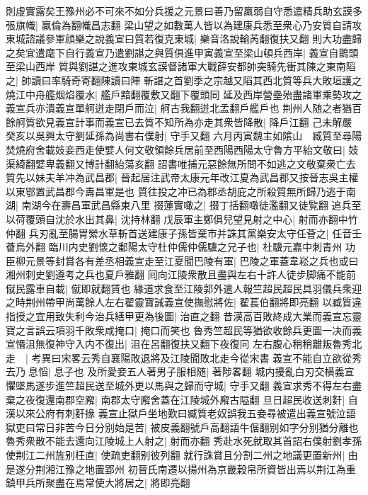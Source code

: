 則虛實露矣王豫州必不可來不如分兵援之元景曰善乃留羸弱自守悉遣精兵助玄謨多張旗幟|{
	羸倫為翻幟昌志翻}
梁山望之如數萬人皆以為建康兵悉至衆心乃安質自請攻東城諮議參軍顔樂之說義宣曰質若復克東城|{
	樂音洛說輸芮翻復扶又翻}
則大功盡歸之矣宜遣麾下自行義宣乃遣劉諶之與質俱進甲寅義宣至梁山頓兵西岸|{
	義宣自鵲頭至梁山西岸}
質與劉諶之進攻東城玄謨督諸軍大戰薛安都帥突騎先衝其陳之東南䧟之|{
	帥讀曰率騎奇寄翻陳讀曰陣}
斬諶之首劉季之宗越又䧟其西北質等兵大敗垣護之燒江中舟艦烟焰覆水|{
	艦戶黯翻覆敷又翻下覆頭同}
延及西岸營壘殆盡諸軍乘勢攻之義宣兵亦潰義宣單舸迸走閉戶而泣|{
	舸古我翻迸北孟翻戶艦戶也}
荆州人随之者猶百餘舸質欲見義宣計事而義宣已去質不知所為亦走其衆皆降散|{
	降戶江翻}
己未解嚴　癸亥以吳興太守劉延孫為尚書右僕射|{
	守手又翻}
六月丙寅魏主如隂山　臧質至尋陽焚燒府舍載妓妾西走使嬖人何文敬領餘兵居前至西陽西陽太守魯方平紿文敬曰|{
	妓渠綺翻嬖卑義翻又博計翻紿蕩亥翻}
詔書唯捕元惡餘無所問不如逃之文敬棄衆亡去質先以妹夫羊冲為武昌郡|{
	晉起居注武帝太康元年改江夏為武昌郡又按晉志吳主權以東鄂置武昌郡今夀昌軍是也}
質往投之冲已為郡丞胡庇之所殺質無所歸乃逃于南湖|{
	南湖今在壽昌軍武昌縣東八里}
掇蓮實噉之|{
	掇丁括翻噉徒濫翻又徒覧翻}
追兵至以荷覆頭自沈於水出其鼻|{
	沈持林翻}
戊辰軍主鄭俱兒望見射之中心|{
	射而亦翻中竹仲翻}
兵刃亂至腸胃縈水草斬首送建康子孫皆棄市并誅其黨樂安太守任薈之|{
	任音壬薈烏外翻}
臨川内史劉懷之鄱陽太守杜仲儒仲儒驥之兄子也|{
	杜驥元嘉中刺青州}
功臣柳元景等封賞各有差丞相義宣走至江夏聞巴陵有軍|{
	巴陵之軍蓋韋崧之兵也或曰湘州刺史劉遵考之兵也夏戶雅翻}
囘向江陵衆散且盡與左右十許人徒步脚痛不能前僦民露車自載|{
	僦即就翻賃也}
緣道求食至江陵郭外遣人報竺超民超民具羽儀兵衆迎之時荆州帶甲尚萬餘人左右翟靈寶誡義宣使撫慰將佐|{
	翟萇伯翻將即亮翻}
以臧質違指授之宜用致失利今治兵繕甲更為後圖|{
	治直之翻}
昔漢高百敗終成大業而義宣忘靈寶之言誤云項羽千敗衆咸掩口|{
	掩口而笑也}
魯秀竺超民等猶欲收餘兵更圖一决而義宣惽沮無復神守入内不復出|{
	沮在呂翻復扶又翻下夜復冋}
左右腹心稍稍離叛魯秀北走　|{
	考異曰宋畧云秀自襄陽敗退將及江陵聞敗北走今從宋書}
義宣不能自立欲從秀去乃息慆|{
	息子也}
及所愛妾五人著男子服相随|{
	著陟畧翻}
城内擾亂白刃交横義宣懼墜馬遂步進竺超民送至城外更以馬與之歸而守城|{
	守手又翻}
義宣求秀不得左右盡棄之夜復還南郡空廨|{
	南郡太守廨舍蓋在江陵城外廨古隘翻}
旦日超民收送刺姧|{
	自漢以來公府有刺姧掾}
義宣止獄戶坐地歎曰臧質老奴誤我五妾尋被遣出義宣號泣語獄吏曰常日非苦今日分别始是苦|{
	被皮義翻號戶高翻語牛倨翻别如字分别猶分離也}
魯秀衆散不能去還向江陵城上人射之|{
	射而亦翻}
秀赴水死就取其首詔右僕射劉孝孫使荆江二州旌别枉直|{
	使疏吏翻别彼列翻}
就行誅賞且分割二州之地議更置新州|{
	由是遂分荆湘江豫之地置郢州}
初晉氏南遷以揚州為京畿穀帛所資皆出焉以荆江為重鎮甲兵所聚盡在焉常使大將居之|{
	將即亮翻}
